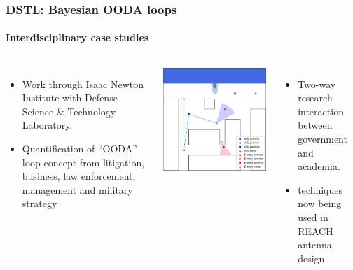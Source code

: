 \documentclass[aspectratio=169, handout]{beamer}
\begin{document}
\begin{frame}
    \frametitle{DSTL: Bayesian OODA loops}
    \framesubtitle{Interdisciplinary case studies}
    \begin{columns}
        \begin{itemize}
            \item Work through Isaac Newton Institute with Defense Science \& Technology Laboratory.
            \item Quantification of ``OODA'' loop concept from litigation, business, law enforcement, management and military strategy
        \end{itemize}


        \begin{columns}
            \includegraphics[width=\textwidth]{figures/midas.png}%
            \begin{itemize}
                \item Two-way research interaction between government and academia.
                \item techniques now being used in REACH antenna design~
            \end{itemize}
        \end{columns}



\end{columns}
\end{frame}
\end{document}

